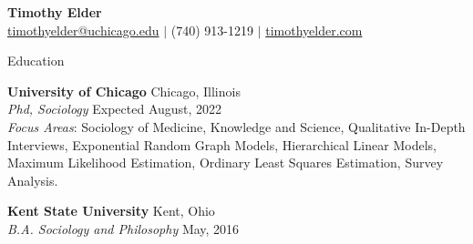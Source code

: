 \documentclass{resume}
\makeatletter
\def\myemail{timothyelder@uchicago.edu}
\makeatother
\begin{document}
\begin{center}
\thispagestyle{empty}
\large \textbf{Timothy Elder \\}
\normalsize \href{mailto:\myemail}{\myemail} $\mid$ (740) 913-1219 $\mid$ \href{http://timothyelder.com/}{timothyelder.com}   \\
\end{center}

\begin{rSection}{Education}

\textbf{University of Chicago} \hfill Chicago, Illinois\\
\textit{Phd, Sociology} \hfill Expected August, 2022\\

\textit{Focus Areas}: Sociology of Medicine, Knowledge and Science, Qualitative In-Depth Interviews, Exponential Random Graph Models, Hierarchical Linear Models, Maximum Likelihood Estimation, Ordinary Least Squares Estimation, Survey Analysis.

\textbf{Kent State University} \hfill Kent, Ohio \\
\textit{B.A. Sociology and Philosophy} \hfill May, 2016\\

\end{rSection}
\end{document}
